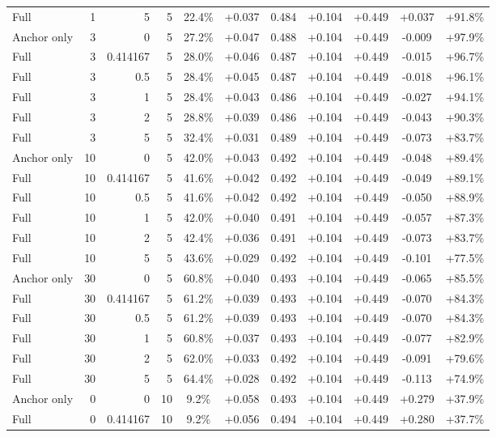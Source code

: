 \begin{table}[htbp]
\begin{tabular}{lrrrccccccc}
Full & 1 & 5 & 5 & 22.4\% & +0.037 & 0.484 & +0.104 & +0.449 & +0.037 & +91.8\% \\
Anchor only & 3 & 0 & 5 & 27.2\% & +0.047 & 0.488 & +0.104 & +0.449 & -0.009 & +97.9\% \\
Full & 3 & 0.414167 & 5 & 28.0\% & +0.046 & 0.487 & +0.104 & +0.449 & -0.015 & +96.7\% \\
Full & 3 & 0.5 & 5 & 28.4\% & +0.045 & 0.487 & +0.104 & +0.449 & -0.018 & +96.1\% \\
Full & 3 & 1 & 5 & 28.4\% & +0.043 & 0.486 & +0.104 & +0.449 & -0.027 & +94.1\% \\
Full & 3 & 2 & 5 & 28.8\% & +0.039 & 0.486 & +0.104 & +0.449 & -0.043 & +90.3\% \\
Full & 3 & 5 & 5 & 32.4\% & +0.031 & 0.489 & +0.104 & +0.449 & -0.073 & +83.7\% \\
Anchor only & 10 & 0 & 5 & 42.0\% & +0.043 & 0.492 & +0.104 & +0.449 & -0.048 & +89.4\% \\
Full & 10 & 0.414167 & 5 & 41.6\% & +0.042 & 0.492 & +0.104 & +0.449 & -0.049 & +89.1\% \\
Full & 10 & 0.5 & 5 & 41.6\% & +0.042 & 0.492 & +0.104 & +0.449 & -0.050 & +88.9\% \\
Full & 10 & 1 & 5 & 42.0\% & +0.040 & 0.491 & +0.104 & +0.449 & -0.057 & +87.3\% \\
Full & 10 & 2 & 5 & 42.4\% & +0.036 & 0.491 & +0.104 & +0.449 & -0.073 & +83.7\% \\
Full & 10 & 5 & 5 & 43.6\% & +0.029 & 0.492 & +0.104 & +0.449 & -0.101 & +77.5\% \\
Anchor only & 30 & 0 & 5 & 60.8\% & +0.040 & 0.493 & +0.104 & +0.449 & -0.065 & +85.5\% \\
Full & 30 & 0.414167 & 5 & 61.2\% & +0.039 & 0.493 & +0.104 & +0.449 & -0.070 & +84.3\% \\
Full & 30 & 0.5 & 5 & 61.2\% & +0.039 & 0.493 & +0.104 & +0.449 & -0.070 & +84.3\% \\
Full & 30 & 1 & 5 & 60.8\% & +0.037 & 0.493 & +0.104 & +0.449 & -0.077 & +82.9\% \\
Full & 30 & 2 & 5 & 62.0\% & +0.033 & 0.492 & +0.104 & +0.449 & -0.091 & +79.6\% \\
Full & 30 & 5 & 5 & 64.4\% & +0.028 & 0.492 & +0.104 & +0.449 & -0.113 & +74.9\% \\
Anchor only & 0 & 0 & 10 & 9.2\% & +0.058 & 0.493 & +0.104 & +0.449 & +0.279 & +37.9\% \\
Full & 0 & 0.414167 & 10 & 9.2\% & +0.056 & 0.494 & +0.104 & +0.449 & +0.280 & +37.7\% \\

\end{tabular}
\end{table}
